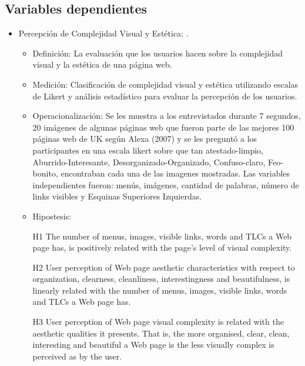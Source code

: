 \subsection{Variables dependientes}
\begin{itemize}
    \item Percepción de Complejidad Visual y Estética: \cite{michailidou2008visual}.
    \begin{itemize}
        \item Definición: La evaluación que los usuarios hacen sobre la complejidad visual y la estética de una página web.
        \item Medición: Clasificación de complejidad visual y estética utilizando escalas de Likert y análisis estadístico para evaluar la percepción de los usuarios. 
        \item Operacionalización: Se les muestra a los entrevistados durante 7 segundos, 20 imágenes de algunas páginas web que fueron parte de las mejores 100 páginas web de UK según Alexa (2007) y se les preguntó a los participantes en una escala likert sobre que tan atestado-limpio, Aburrido-Interesante, Desorganizado-Organizado, Confuso-claro, Feo-bonito, encontraban cada una de las imagenes mostradas. Las variables independientes fueron: menús, imágenes, cantidad de palabras, número de links visibles y Esquinas Superiores Izquierdas.  
        \item Hipostesis: 
        
        H1 The number of menus, images, visible links, words and TLCs a Web page has, is positively related with the page’s level of visual complexity.
        
        H2 User perception of Web page aesthetic characteristics with respect to organization, clearness, cleanliness, interestingness and beautifulness, is linearly related with the number of menus, images, visible links, words and TLCs a Web page has.

        H3 User perception of Web page visual complexity is related with the aesthetic qualities it presents. That is, the more organised, clear, clean, interesting and beautiful a Web page is the less visually complex is perceived as by the user.
    \end{itemize}
    

\end{itemize}

